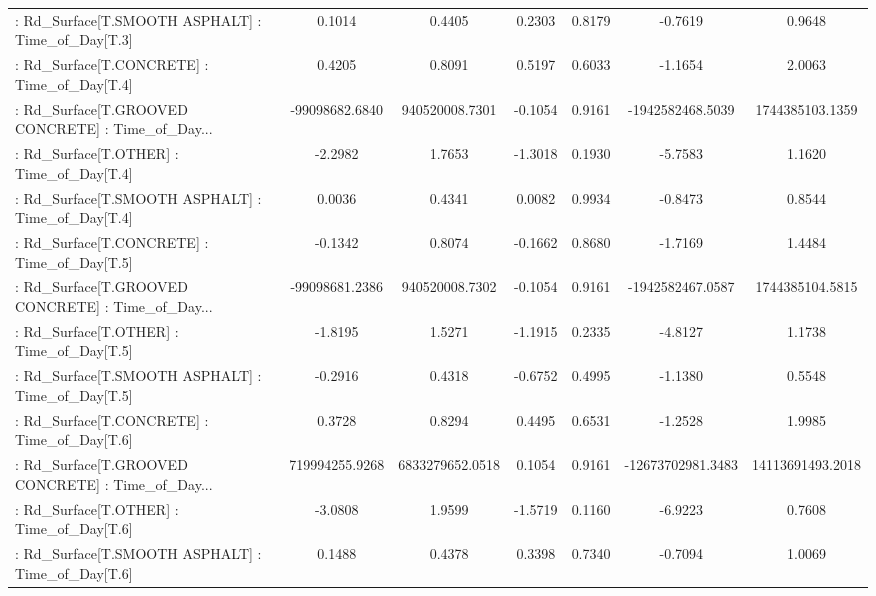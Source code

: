 \begin{longtable}{p{4cm}cccccc}
 : Rd\_Surface[T.SMOOTH ASPHALT] : Time\_of\_Day[T.3] &            0.1014 &            0.4405 &  0.2303 &       0.8179 &            -0.7619 &            0.9648 \\
 : Rd\_Surface[T.CONCRETE] : Time\_of\_Day[T.4]       &            0.4205 &            0.8091 &  0.5197 &       0.6033 &            -1.1654 &            2.0063 \\
 : Rd\_Surface[T.GROOVED CONCRETE] : Time\_of\_Day... &    -99098682.6840 &    940520008.7301 & -0.1054 &       0.9161 &   -1942582468.5039 &   1744385103.1359 \\
 : Rd\_Surface[T.OTHER] : Time\_of\_Day[T.4]          &           -2.2982 &            1.7653 & -1.3018 &       0.1930 &            -5.7583 &            1.1620 \\
 : Rd\_Surface[T.SMOOTH ASPHALT] : Time\_of\_Day[T.4] &            0.0036 &            0.4341 &  0.0082 &       0.9934 &            -0.8473 &            0.8544 \\
 : Rd\_Surface[T.CONCRETE] : Time\_of\_Day[T.5]       &           -0.1342 &            0.8074 & -0.1662 &       0.8680 &            -1.7169 &            1.4484 \\
 : Rd\_Surface[T.GROOVED CONCRETE] : Time\_of\_Day... &    -99098681.2386 &    940520008.7302 & -0.1054 &       0.9161 &   -1942582467.0587 &   1744385104.5815 \\
 : Rd\_Surface[T.OTHER] : Time\_of\_Day[T.5]          &           -1.8195 &            1.5271 & -1.1915 &       0.2335 &            -4.8127 &            1.1738 \\
 : Rd\_Surface[T.SMOOTH ASPHALT] : Time\_of\_Day[T.5] &           -0.2916 &            0.4318 & -0.6752 &       0.4995 &            -1.1380 &            0.5548 \\
 : Rd\_Surface[T.CONCRETE] : Time\_of\_Day[T.6]       &            0.3728 &            0.8294 &  0.4495 &       0.6531 &            -1.2528 &            1.9985 \\
 : Rd\_Surface[T.GROOVED CONCRETE] : Time\_of\_Day... &    719994255.9268 &   6833279652.0518 &  0.1054 &       0.9161 &  -12673702981.3483 &  14113691493.2018 \\
 : Rd\_Surface[T.OTHER] : Time\_of\_Day[T.6]          &           -3.0808 &            1.9599 & -1.5719 &       0.1160 &            -6.9223 &            0.7608 \\
 : Rd\_Surface[T.SMOOTH ASPHALT] : Time\_of\_Day[T.6] &            0.1488 &            0.4378 &  0.3398 &       0.7340 &            -0.7094 &            1.0069 \\

\end{longtable}
